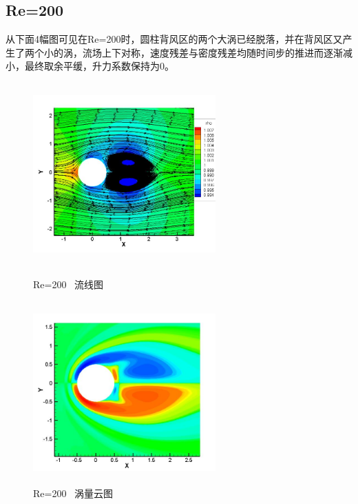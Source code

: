 \documentclass[UTF8]{ctexart}
\begin{document}
\subsection{Re=200}
从下面4幅图可见在Re=200时，圆柱背风区的两个大涡已经脱落，并在背风区又产生了两个小的涡，流场上下对称，速度残差与密度残差均随时间步的推进而逐渐减小，最终取余平缓，升力系数保持为0。
\begin{figure}[htbp]\centering
\begin{minipage}{7cm}
\includegraphics[height=7cm,width=7cm]{../pic/Streamline_200.JPG}
\caption{Re=200 \ 流线图}
\end{minipage}
\begin{minipage}{7cm}
\includegraphics[height=7cm,width=7cm]{../pic/Vorticity_200.JPG}
\caption{Re=200 \ 涡量云图}
\end{minipage}


\end{figure}
\end{document}
